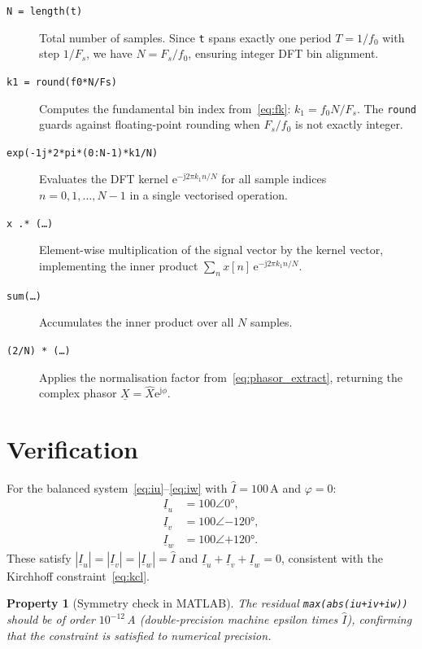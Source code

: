 \documentclass[11pt,a4paper]{article}
\newcommand{\jj}{\mathrm{j}}          %
\newcommand{\e}{\mathrm{e}}           %
\newtheorem{property}{Property}
\begin{document}
\begin{description}
  \item[\texttt{N = length(t)}]
    Total number of samples.  Since \texttt{t} spans exactly one period
    $T = 1/f_0$ with step $1/F_s$, we have $N = F_s/f_0$, ensuring integer
    DFT bin alignment.

  \item[\texttt{k1 = round(f0*N/Fs)}]
    Computes the fundamental bin index from~\eqref{eq:fk}:
    $k_1 = f_0 N / F_s$.  The \texttt{round} guards against floating-point
    rounding when $F_s/f_0$ is not exactly integer.

  \item[\texttt{exp(-1j*2*pi*(0:N-1)*k1/N)}]
    Evaluates the DFT kernel $\e^{-\jj 2\pi k_1 n/N}$ for all sample indices
    $n = 0,1,\ldots,N-1$ in a single vectorised operation.

  \item[\texttt{x .* (\ldots)}]
    Element-wise multiplication of the signal vector by the kernel vector,
    implementing the inner product $\sum_n x[n]\,\e^{-\jj 2\pi k_1 n/N}$.

  \item[\texttt{sum(\ldots)}]
    Accumulates the inner product over all $N$ samples.

  \item[\texttt{(2/N) * (\ldots)}]
    Applies the normalisation factor from~\eqref{eq:phasor_extract}, returning
    the complex phasor $\underline{X} = \hat{X}\e^{\jj\phi}$.
\end{description}

\section{Verification}

For the balanced system~\eqref{eq:iu}--\eqref{eq:iw} with $\hat{I}=100\,\text{A}$
and $\varphi = 0$:
\begin{align*}
  \underline{I}_u &= 100\angle 0°,\\
  \underline{I}_v &= 100\angle{-120°},\\
  \underline{I}_w &= 100\angle{+120°}.
\end{align*}
These satisfy $|\underline{I}_u|=|\underline{I}_v|=|\underline{I}_w|=\hat{I}$
and $\underline{I}_u+\underline{I}_v+\underline{I}_w=0$, consistent with
the Kirchhoff constraint~\eqref{eq:kcl}.

\begin{property}[Symmetry check in MATLAB]
  The residual \texttt{max(abs(iu+iv+iw))} should be of order $10^{-12}$\,A
  (double-precision machine epsilon times $\hat{I}$), confirming that the
  constraint is satisfied to numerical precision.
\end{property}
\end{document}
